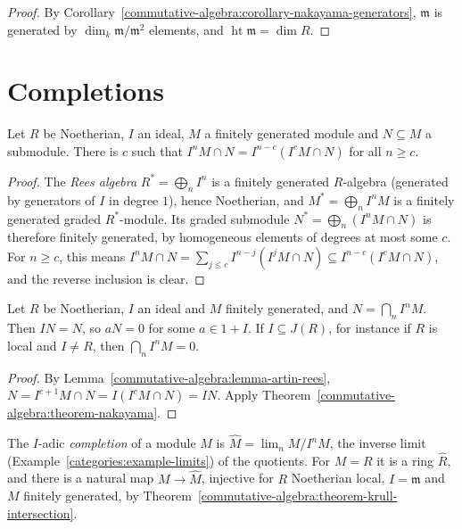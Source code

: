 \begin{proof}
By Corollary~\ref{commutative-algebra:corollary-nakayama-generators}, $\mathfrak{m}$ is generated by $\dim_k\mathfrak{m}/\mathfrak{m}^2$ elements, and
$\operatorname{ht}\mathfrak{m} = \dim R$.
\end{proof}

\section{Completions}\label{commutative-algebra:section-completions}

\begin{lemma}\label{commutative-algebra:lemma-artin-rees}
Let $R$ be Noetherian, $I$ an ideal, $M$ a finitely generated module and $N \subseteq M$ a submodule. There is $c$ such that
$I^nM \cap N = I^{n-c}(I^cM \cap N)$ for all $n \geq c$.
\end{lemma}

\begin{proof}
The \emph{Rees algebra} $R^* = \bigoplus_n I^n$ is a finitely generated $R$-algebra (generated by generators of $I$ in degree $1$), hence
Noetherian, and $M^* = \bigoplus_n I^nM$ is a finitely generated graded $R^*$-module. Its graded submodule
$N^* = \bigoplus_n(I^nM \cap N)$ is therefore finitely generated, by homogeneous elements of degrees at most some $c$. For $n \geq c$,
this means $I^nM \cap N = \sum_{j \leq c} I^{n-j}(I^jM \cap N) \subseteq I^{n-c}(I^cM \cap N)$, and the reverse inclusion is clear.
\end{proof}

\begin{theorem}\label{commutative-algebra:theorem-krull-intersection}
Let $R$ be Noetherian, $I$ an ideal and $M$ finitely generated, and $N = \bigcap_n I^nM$. Then $IN = N$, so $aN = 0$ for some
$a \in 1 + I$. If $I \subseteq J(R)$, for instance if $R$ is local and $I \neq R$, then $\bigcap_nI^nM = 0$.
\end{theorem}

\begin{proof}
By Lemma~\ref{commutative-algebra:lemma-artin-rees}, $N = I^{c+1}M \cap N = I(I^cM \cap N) = IN$. Apply
Theorem~\ref{commutative-algebra:theorem-nakayama}.
\end{proof}

\begin{definition}\label{commutative-algebra:definition-completion}
The $I$-adic \emph{completion} of a module $M$ is $\hat M = \lim_n M/I^nM$, the inverse limit
(Example~\ref{categories:example-limits}) of the quotients. For $M = R$ it is a ring $\hat R$, and there is a natural map $M \to \hat M$,
injective for $R$ Noetherian local, $I = \mathfrak{m}$ and $M$ finitely generated, by
Theorem~\ref{commutative-algebra:theorem-krull-intersection}.
\end{definition}

